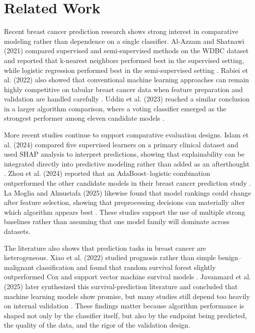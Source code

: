 \documentclass[conference]{IEEEtran}
\begin{document}
\section{Related Work}
Recent breast cancer prediction research shows strong interest in comparative modeling rather than dependence on a single classifier. Al-Azzam and Shatnawi (2021) compared supervised and semi-supervised methods on the WDBC dataset and reported that k-nearest neighbors performed best in the supervised setting, while logistic regression performed best in the semi-supervised setting \cite{b3}. Rabiei et al. (2022) also showed that conventional machine learning approaches can remain highly competitive on tabular breast cancer data when feature preparation and validation are handled carefully \cite{b12}. Uddin et al. (2023) reached a similar conclusion in a larger algorithm comparison, where a voting classifier emerged as the strongest performer among eleven candidate models \cite{b13}.

More recent studies continue to support comparative evaluation designs. Islam et al. (2024) compared five supervised learners on a primary clinical dataset and used SHAP analysis to interpret predictions, showing that explainability can be integrated directly into predictive modeling rather than added as an afterthought \cite{b14}. Zhou et al. (2024) reported that an AdaBoost--logistic combination outperformed the other candidate models in their breast cancer prediction study \cite{b9}. La Moglia and Almustafa (2025) likewise found that model rankings could change after feature selection, showing that preprocessing decisions can materially alter which algorithm appears best \cite{b6}. These studies support the use of multiple strong baselines rather than assuming that one model family will dominate across datasets.

The literature also shows that prediction tasks in breast cancer are heterogeneous. Xiao et al. (2022) studied prognosis rather than simple benign--malignant classification and found that random survival forest slightly outperformed Cox and support vector machine survival models \cite{b10}. Javanmard et al. (2025) later synthesized this survival-prediction literature and concluded that machine learning models show promise, but many studies still depend too heavily on internal validation \cite{b19}. These findings matter because algorithm performance is shaped not only by the classifier itself, but also by the endpoint being predicted, the quality of the data, and the rigor of the validation design.
\end{document}
